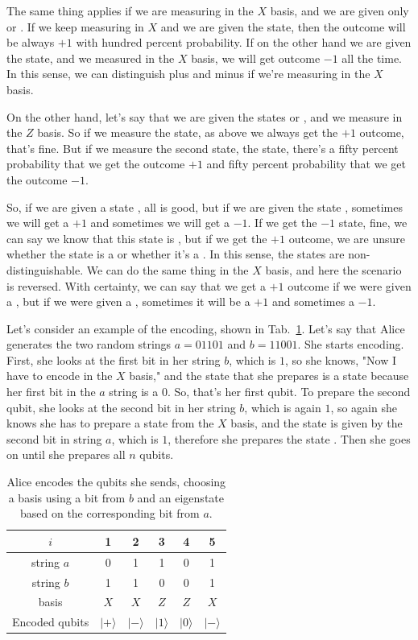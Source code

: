The same thing applies if we are measuring in the $X$ basis, and we are given only \ket{+} or \ket{-}. If we keep measuring in $X$ and we are given the \ket{+} state, then the outcome will be always $+1$ with hundred percent probability. If on the other hand we are given the \ket{-} state, and we measured in the $X$ basis, we will get outcome $-1$ all the time. In this sense, we can distinguish plus and minus if we're measuring in the $X$ basis.

On the other hand, let's say that we are given the states  or \ket{+}, and we measure in the $Z$ basis. So if we measure the  state, as above we always get the $+1$ outcome, that's fine. But if we measure the second state, the \ket{+} state, there's a fifty percent probability that we get the outcome $+1$ and fifty percent probability that we get the outcome $-1$.

So, if we are given a state , all is good, but if we are given the state \ket{+}, sometimes we will get a $+1$ and sometimes we will get a $-1$. If we get the $-1$ state, fine, we can say we know that this state is \ket{+}, but if we get the $+1$ outcome, we are unsure whether the state is a \ket{+} or whether it's a . In this sense, the states are non-distinguishable. We can do the same thing in the $X$ basis, and here the scenario is reversed. With certainty, we can say that we get a $+1$ outcome if we were given a \ket{+}, but if we were given a , sometimes it will be a $+1$ and sometimes a $-1$.

Let's consider an example of the encoding, shown in Tab.~\ref{tab:bb84-example}. Let's say that Alice generates the two random strings $a = 01101$ and $b=11001$. She starts encoding.  First, she looks at the first bit in her string $b$, which is $1$, so she knows, "Now I have to encode in the $X$ basis," and the state that she prepares is a \ket{+} state because her first bit in the $a$ string is a $0$. So, that's her first qubit. To prepare the second qubit, she looks at the second bit in her string $b$, which is again $1$, so again she knows she has to prepare a state from the $X$ basis, and the state is given by the second bit in string $a$, which is $1$, therefore she prepares the state \ket{-}. Then she goes on until she prepares all $n$ qubits.

\begin{table}
\begin{tabular}{|c||c|c|c|c|c|}
\hline $i$ & 1 & 2 & 3 & 4 & 5 \\
\hline string $a$ & 0 & 1 & 1 & 0 & 1 \\
string $b$ & 1 & 1 & 0 & 0 & 1 \\
basis & $X$ & $X$ & $Z$ & $Z$ & $X$ \\
Encoded qubits & $|+\rangle$ & $|-\rangle$ & $|1\rangle$ & $|0\rangle$ & $|-\rangle$ \\
\hline
\end{tabular}
\caption[BB84 encoding example]{Alice encodes the qubits she sends, choosing a basis using a bit from $b$ and an eigenstate based on the corresponding bit from $a$.}
\label{tab:bb84-example}
\end{table}

